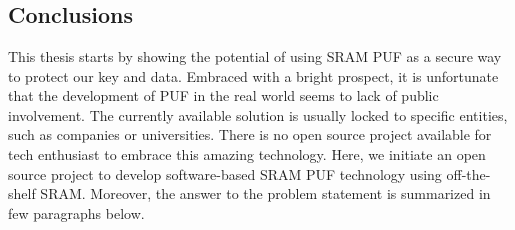 \chapter{\chapterSix}
\label{chp:6}

\section{Conclusions}
This thesis starts by showing the potential of using SRAM PUF as a secure way to protect our key and data. Embraced with a bright prospect, it is unfortunate that the development of PUF in the real world seems to lack of public involvement. The currently available solution is usually locked to specific entities, such as companies or universities. There is no open source project available for tech enthusiast to embrace this amazing technology. Here, we initiate an open source project to develop software-based SRAM PUF technology using off-the-shelf SRAM. Moreover, the answer to the problem statement is summarized in few paragraphs below.


